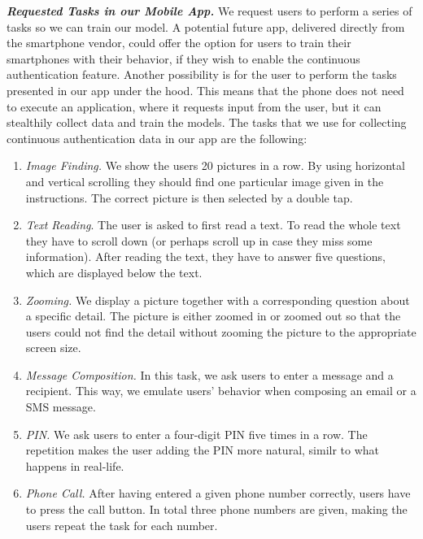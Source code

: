 \documentclass{llncs}
\begin{document}
\medskip \noindent \textbf{\emph{Requested Tasks in our Mobile App.}}
We request users to perform a series of tasks so we can train our model. A potential future app, delivered directly from the smartphone vendor, could offer the option for users to train their smartphones with their behavior, if they wish to enable the continuous authentication feature. Another possibility is for the user to perform the tasks presented in our app under the hood. This means that the phone does not need to execute an application, where it requests input from the user, but it can stealthily collect data and train the models. The tasks that we use for collecting continuous authentication data in our app are the following:

\begin{enumerate}
%
\item \emph{Image Finding.} We show the users 20 pictures in a row. By using horizontal and vertical scrolling they should find one particular image given in the instructions. The correct picture is then selected by a double tap.
%
\item \emph{Text Reading}. The user is asked to first read a text. To read the whole text they have to scroll down (or perhaps scroll up in case they miss some information). After reading the text, they have to answer five questions, which are displayed below the text.
%
\item \emph{Zooming.} We display a picture together with a corresponding question about a specific detail. The picture is either zoomed in or zoomed out so that the users could not find the detail without zooming the picture to the appropriate screen size. %
%
\item \emph{Message Composition.} In this task, we ask users to enter a message and a recipient. %
This way, we emulate users' behavior when composing an email or a SMS message.
%
\item \emph{PIN.} We ask users to enter a four-digit PIN five times in a row. The repetition makes the user adding the PIN more natural, similr to what happens in real-life.
%
\item \emph{Phone Call.} After having entered a given phone number correctly, users have to press the call button. In total three phone numbers are given, making the users repeat the task for each number.
%
\end{enumerate}
\end{document}
